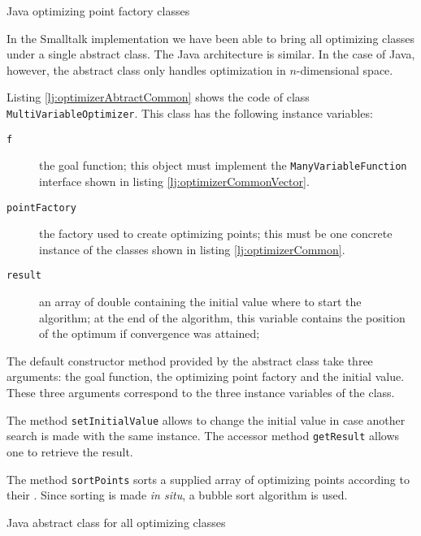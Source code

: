 \documentclass[twoside]{book}
\begin{document}
\begin{listing} Java optimizing point factory classes \label{lj:optimizerCommon}



\end{listing}

In the Smalltalk implementation we have been able to bring all
optimizing classes under a single abstract class. The Java
architecture is similar. In the case of Java, however, the
abstract class only handles optimization in $n$-dimensional space.

Listing \ref{lj:optimizerAbtractCommon} shows the code of class
{\tt MultiVariableOptimizer}. This class has the following
instance variables:
\begin{description}
  \item[\tt f] the goal function; this object must implement the
  {\tt ManyVariableFunction} interface shown in listing
  \ref{lj:optimizerCommonVector}.
  \item[\tt pointFactory] the factory used to create optimizing
  points; this must be one concrete instance of the classes shown
  in listing \ref{lj:optimizerCommon}.
  \item[\tt result] an array of double containing the initial value
  where to start the algorithm; at the end of the
  algorithm, this variable contains the position of the optimum if
  convergence was attained;
\end{description}
The default constructor method provided by the abstract class take
three arguments: the goal function, the optimizing point factory
and the initial value. These three arguments correspond to the
three instance variables of the class.

The method {\tt setInitialValue} allows to change the initial
value in case another search is made with the same instance. The
accessor method {\tt getResult} allows one to retrieve the result.

The method {\tt sortPoints} sorts a supplied array of optimizing
points according to their . Since sorting is
made {\it in situ}, a bubble sort algorithm is used.

\begin{listing} Java abstract class for all optimizing classes \label{lj:optimizerAbtractCommon}

\end{listing}
\end{document}
